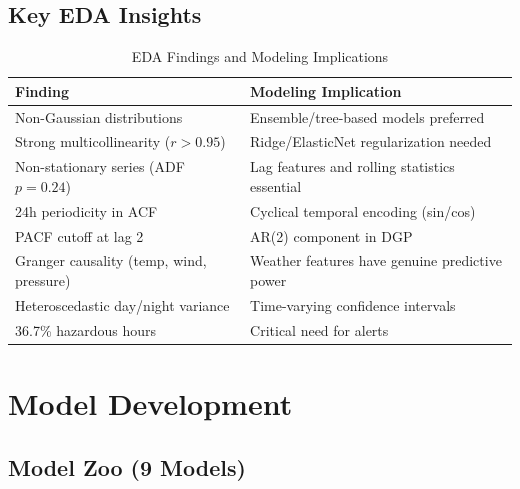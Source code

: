 \documentclass[12pt, a4paper, oneside]{article}
\begin{document}
\subsection{Key EDA Insights}

\begin{table}[H]
\centering
\caption{EDA Findings and Modeling Implications}
\label{tab:eda_insights}
\begin{tabularx}{\textwidth}{X X}
\toprule
\textbf{Finding} & \textbf{Modeling Implication} \\
\midrule
Non-Gaussian distributions & Ensemble/tree-based models preferred \\
Strong multicollinearity ($r > 0.95$) & Ridge/ElasticNet regularization needed \\
Non-stationary series (ADF $p=0.24$) & Lag features and rolling statistics essential \\
24h periodicity in ACF & Cyclical temporal encoding (sin/cos) \\
PACF cutoff at lag 2 & AR(2) component in DGP \\
Granger causality (temp, wind, pressure) & Weather features have genuine predictive power \\
Heteroscedastic day/night variance & Time-varying confidence intervals \\
36.7\% hazardous hours & Critical need for alerts \\
\bottomrule
\end{tabularx}
\end{table}

\section{Model Development}

\subsection{Model Zoo (9 Models)}
\end{document}
